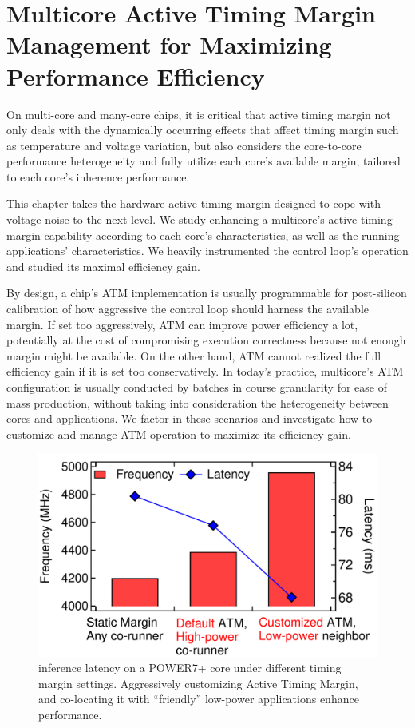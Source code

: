
\chapter{Multicore Active Timing Margin Management for Maximizing Performance Efficiency}
\label{sec:process}

On multi-core and many-core chips, it is critical that active timing margin not only deals with the dynamically occurring effects that affect timing margin such as temperature and voltage variation, but also considers the core-to-core performance heterogeneity and fully utilize each core's available margin, tailored to each core's inherence performance.

This chapter takes the hardware active timing margin designed to cope with voltage noise to the next level. We study enhancing a multicore's active timing margin capability according to each core's characteristics, as well as the running applications' characteristics. We heavily instrumented the control loop's operation and studied its maximal efficiency gain.

By design, a chip's ATM implementation is usually programmable for post-silicon calibration of how aggressive the control loop should harness the available margin. If set too aggressively, ATM can improve power efficiency a lot, potentially at the cost of compromising execution correctness because not enough margin might be available. On the other hand, ATM cannot realized the full efficiency gain if it is set too conservatively. In today's practice, multicore's ATM configuration is usually conducted by batches in course granularity for ease of mass production, without taking into consideration the heterogeneity between cores and applications. We factor in these scenarios and investigate how to customize and manage ATM operation to maximize its efficiency gain.

\begin{figure}[t]
  \centering
  \includegraphics[trim=0 0 0 0,clip,width=.825\linewidth]{graphs/process//noisy-latency.pdf}
  \caption{ inference latency on a POWER7+ core under different timing margin settings. Aggressively customizing Active Timing Margin, and co-locating it with ``friendly'' low-power applications enhance performance.}

  \label{fig:motivate-latency}
\end{figure}

